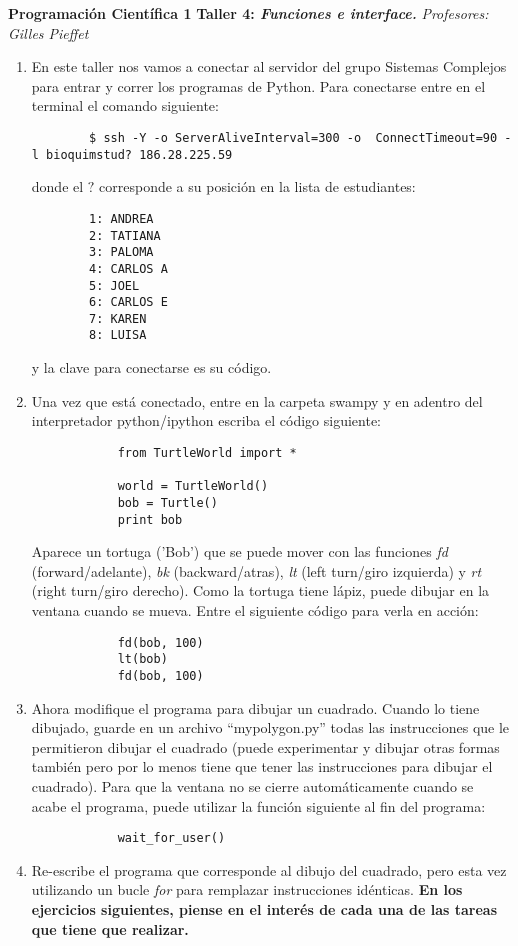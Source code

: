 \documentclass[10pt, twocolumn]{article}
\begin{document}
\noindent
{\Large \bf Programación Científica 1}
\vskip 0.3cm
\noindent
{\large \bf Taller 4: {\it Funciones e interface.}}
\vskip 0.2cm
\noindent
{\it Profesores:  Gilles Pieffet}\\


\noindent
\begin{enumerate}
\item En este taller nos vamos a conectar al servidor del grupo Sistemas Complejos para entrar y correr los programas de Python. Para conectarse entre en el terminal el comando siguiente:
	\begin{verbatim}
		$ ssh -Y -o ServerAliveInterval=300 -o	ConnectTimeout=90 -l bioquimstud? 186.28.225.59
	\end{verbatim}
donde el $?$ corresponde a su posición en la lista de estudiantes:
	\begin{verbatim}
		1: ANDREA
		2: TATIANA
		3: PALOMA
		4: CARLOS A
		5: JOEL
		6: CARLOS E
		7: KAREN 
		8: LUISA 
	\end{verbatim}
y la clave para conectarse es su código.

	\item Una vez que está conectado, entre en la carpeta swampy y en adentro del interpretador python/ipython escriba el código siguiente:
		\begin{verbatim}
			from TurtleWorld import *

			world = TurtleWorld()
			bob = Turtle()
			print bob
		\end{verbatim}
Aparece un tortuga ('Bob') que se puede mover con las funciones \emph{fd} (forward/adelante), \emph{bk} (backward/atras), \emph{lt} (left turn/giro izquierda) y \emph{rt} (right turn/giro derecho). Como la tortuga tiene lápiz, puede dibujar en la ventana cuando se mueva. Entre el siguiente código para verla en acción:
		\begin{verbatim}
			fd(bob, 100)
			lt(bob)
			fd(bob, 100)
		\end{verbatim}
\item Ahora modifique el programa para dibujar un cuadrado. Cuando lo tiene dibujado, guarde en un archivo ``mypolygon.py'' todas las instrucciones que le permitieron dibujar el cuadrado (puede experimentar y dibujar otras formas también pero por lo menos tiene que tener las instrucciones para dibujar el cuadrado). Para que la ventana no se cierre automáticamente cuando se acabe el programa, puede utilizar la función siguiente al fin del programa:
		\begin{verbatim}
			wait_for_user()
		\end{verbatim}
\newpage
\item Re-escribe el programa que corresponde al dibujo del cuadrado, pero esta vez utilizando un bucle \emph{for} para remplazar instrucciones idénticas.
\vskip 0.5mm
\textbf{En los ejercicios siguientes, piense en el interés de cada una de las tareas que tiene que realizar.}


\end{enumerate}
\end{document}
